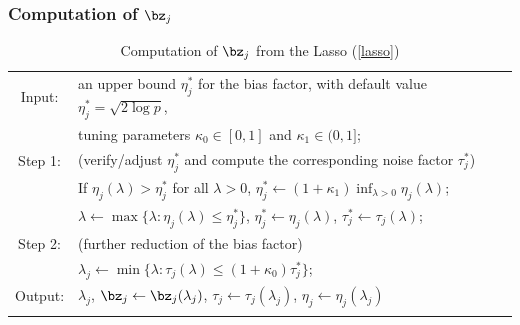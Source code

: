 \begin{frame}
  \frametitle{Computation of $\bz_{j}$}
  \scriptsize
  \begin{table}%
  \caption{Computation of $\bz_j$ from the Lasso (\ref{lasso})}
  \begin{tabular}{cl}
  \toprule
  Input: & an upper bound $\eta_j^*$ for the bias factor, with default value $\eta^*_j=\sqrt{2\log p}$, \\
  & tuning parameters $\kappa_0\in [0,1]$ and $\kappa_1\in (0,1]$; \\
  Step 1: & (verify/adjust $\eta_j^*$ and compute the corresponding noise factor $\tau_j^*$) \\
  & If $\eta_j(\lambda)>\eta_j^*$ for all $\lambda>0$, $\eta_j^* \leftarrow (1+\kappa_1)\inf_{\lambda>0}\eta_j(\lambda)$; \\
  & $\lambda\leftarrow \max\{\lambda: \eta_j(\lambda)\le\eta^*_j\}$,
  $\eta_j^*\leftarrow \eta_j(\lambda)$, $\tau_j^*\leftarrow \tau_j(\lambda)$; \\
  Step 2: & (further reduction of the bias factor)\\
  & $\lambda_j \leftarrow \min\{\lambda: \tau_j(\lambda)\le (1+\kappa_0)\tau^*_j\}$;
  \\
  Output: & $\lambda_j$, $\bz_j\leftarrow \bz_j(\lambda_j)$, $\tau_j\leftarrow \tau_j(\lambda_j)$, $\eta_j\leftarrow \eta_j(\lambda_j)$\\
  \bottomrule
  \addlinespace
  \end{tabular}
  \label{table:alg}
  
  \end{table}
  
  \end{frame}


